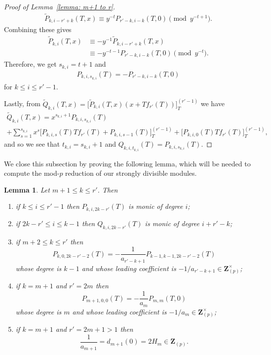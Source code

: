 \documentclass[11pt]{amsart}
\theoremstyle{definition}
\numberwithin{equation}{subsection}
\theoremstyle{plain}
\theoremstyle{plain}
\theoremstyle{plain}
\theoremstyle{plain}
\theoremstyle{plain}
\theoremstyle{plain}
\theoremstyle{plain}
\theoremstyle{plain}
\theoremstyle{plain}
\newtheorem{lemm}[equation]{Lemma}
\theoremstyle{plain}
\theoremstyle{plain}
\theoremstyle{plain}
\theoremstyle{definition}
\theoremstyle{definition}
\theoremstyle{definition}
\theoremstyle{remark}
\renewcommand{\(}{\textup{(}}
\renewcommand{\)}{\textup{)}}
\newcommand{\Z}{\mathbf{Z}}
\begin{document}
\begin{proof}[Proof of Lemma~\ref{lemma: m+1 to r}]
\begin{align*}
        \tilde P_{k,i-r'+k}(T,x)
        \equiv
        y^{-t}P_{r'-k,i-k}(T,0) \pmod{y^{-t+1}}.
    \end{align*}
Combining these gives
    \begin{align*}
        \tilde P_{k,i}(T,x)
        &\equiv -y^{-1}\tilde P_{k,i-r'+k}(T,x)
        \\&\equiv
        -y^{-t-1}P_{r'-k,i-k}(T,0) \pmod{y^{-t}}.
    \end{align*}
Therefore, we get $s_{k,i}=t+1$ and
    \begin{align*}
        P_{k,i,s_{k,i}}(T)=-P_{r'-k,i-k}(T,0)
    \end{align*}
for $k\leq i\leq r'-1$.

Lastly, from $\tilde Q_{k,i}(T,x)=\big[\tilde P_{k,i}(T,x)(x+Tf_{r'}(T))\big]_{T}^{(r'-1)}$ we have
    \begin{multline*}
        \tilde Q_{k,i}(T,x)=
        x^{s_{k,i}+1} P_{k,i,s_{k,i}}(T)\\ +\sum_{s=1}^{s_{k,i}}x^s\big[P_{k,i,s}(T)Tf_{r'}(T)+P_{k,i,s-1}(T)\big]_{T}^{(r'-1)}
        +\big[P_{k,i,0}(T)Tf_{r'}(T)\big]_{T}^{(r'-1)},
    \end{multline*}
and so we see that $t_{k,i}=s_{k,i}+1$ and $Q_{k,i,t_{k,i}}(T)=P_{k,i,s_{k,i}}(T)$.
\end{proof}



We close this subsection by proving the following lemma, which will be needed to compute the mod-$p$ reduction of our strongly divisible modules.
\begin{lemm}\label{lemma: a_k m+1 leq k}
    Let $m+1\leq k\leq r'$. Then
    \begin{enumerate}[leftmargin=*]
        \item if $k\leq i\leq r'-1$ then $P_{k,i,2k-r'}(T)$ is monic of degree $i$;
        \item if $2k-r'\leq i\leq k-1$ then $Q_{k,i,2k-r'}(T)$ is monic of degree $i+r'-k$;
        \item if $m+2\leq k\leq r'$ then
        \begin{equation*}
            P_{k,0,2k-r'-2}(T)=-\frac{1}{a_{r'-k+1}}P_{k-1,k-1,2k-r'-2}(T)
        \end{equation*}
        whose degree is $k-1$ and whose leading coefficient is $-1/a_{r'-k+1}\in\Z_{(p)}^{\times}$;
        \item if $k=m+1$ and $r'=2m$ then
        \begin{equation*}
            P_{m+1,0,0}(T)=-\frac{1}{a_m}P_{m,m}(T,0)
        \end{equation*}
        whose degree is $m$ and whose leading coefficient is $-1/a_m\in\Z_{(p)}^{\times}$;
        \item if $k=m+1$ and $r'=2m+1 >1$ then $$\frac{1}{a_{m+1}}=d_{m+1}(0)=2H_m\in\Z_{(p)}.$$
    \end{enumerate}
\end{lemm}
\end{document}
